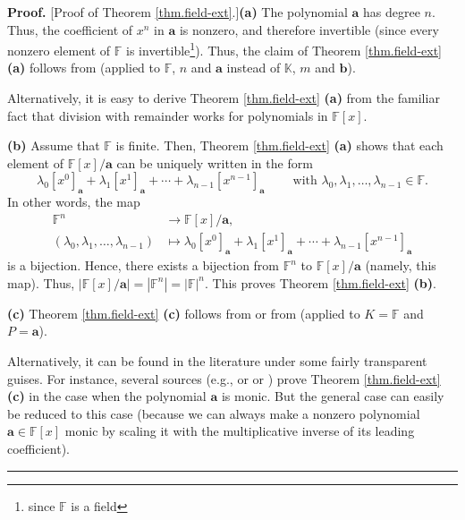 \documentclass[numbers=enddot,12pt,final,onecolumn,notitlepage]{scrartcl}%
\theoremstyle{definition}
\newenvironment{proof}[1][Proof]{\noindent\textbf{#1.} }{\ \rule{0.5em}{0.5em}}
\begin{document}
\begin{proof}
[Proof of Theorem \ref{thm.field-ext}.]\textbf{(a)} The polynomial
$\mathbf{a}$ has degree $n$. Thus, the coefficient of $x^{n}$ in $\mathbf{a}$
is nonzero, and therefore invertible (since every nonzero element of
$\mathbb{F}$ is invertible\footnote{since $\mathbb{F}$ is a field}). Thus, the
claim of Theorem \ref{thm.field-ext} \textbf{(a)} follows from \cite[Theorem
8.1.9 \textbf{(a)}]{19s} (applied to $\mathbb{F}$, $n$ and $\mathbf{a}$
instead of $\mathbb{K}$, $m$ and $\mathbf{b}$).

Alternatively, it is easy to derive Theorem \ref{thm.field-ext} \textbf{(a)}
from the familiar fact that division with remainder works for polynomials in
$\mathbb{F}\left[  x\right]  $.

\textbf{(b)} Assume that $\mathbb{F}$ is finite. Then, Theorem
\ref{thm.field-ext} \textbf{(a)} shows that each element of $\mathbb{F}\left[
x\right]  /\mathbf{a}$ can be uniquely written in the form%
\[
\lambda_{0}\left[  x^{0}\right]  _{\mathbf{a}}+\lambda_{1}\left[
x^{1}\right]  _{\mathbf{a}}+\cdots+\lambda_{n-1}\left[  x^{n-1}\right]
_{\mathbf{a}}\ \ \ \ \ \ \ \ \ \ \text{with }\lambda_{0},\lambda_{1}%
,\ldots,\lambda_{n-1}\in\mathbb{F}.
\]
In other words, the map%
\begin{align*}
\mathbb{F}^{n}  &  \rightarrow\mathbb{F}\left[  x\right]  /\mathbf{a},\\
\left(  \lambda_{0},\lambda_{1},\ldots,\lambda_{n-1}\right)   &
\mapsto\lambda_{0}\left[  x^{0}\right]  _{\mathbf{a}}+\lambda_{1}\left[
x^{1}\right]  _{\mathbf{a}}+\cdots+\lambda_{n-1}\left[  x^{n-1}\right]
_{\mathbf{a}}%
\end{align*}
is a bijection. Hence, there exists a bijection from $\mathbb{F}^{n}$ to
$\mathbb{F}\left[  x\right]  /\mathbf{a}$ (namely, this map). Thus,
$\left\vert \mathbb{F}\left[  x\right]  /\mathbf{a}\right\vert =\left\vert
\mathbb{F}^{n}\right\vert =\left\vert \mathbb{F}\right\vert ^{n}$. This proves
Theorem \ref{thm.field-ext} \textbf{(b)}.

\textbf{(c)} Theorem \ref{thm.field-ext} \textbf{(c)} follows from
\cite[Theorem 8.1.17]{19s} or from \cite[4.7.2]{Escofi01} (applied to
$K=\mathbb{F}$ and $P=\mathbf{a}$).

Alternatively, it can be found in the literature under some fairly transparent
guises. For instance, several sources (e.g., \cite[Theorem 17.2]{Stewar15} or
\cite[proof of Theorem 9.10]{Knapp1} or \cite[1.25]{Milne-FT}) prove Theorem
\ref{thm.field-ext} \textbf{(c)} in the case when the polynomial $\mathbf{a}$
is monic. But the general case can easily be reduced to this case (because we
can always make a nonzero polynomial $\mathbf{a}\in\mathbb{F}\left[  x\right]
$ monic by scaling it with the multiplicative inverse of its leading coefficient).
\end{proof}
\end{document}
